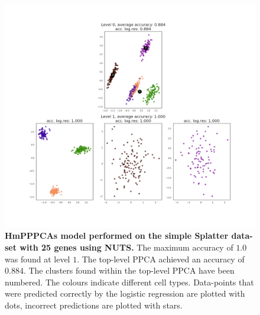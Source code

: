 \begin{figure}
    \centering
    \includegraphics[width=\linewidth]{figs/simple_25_nuts.png}
    \caption[HmPPPCAs model performed on the simple Splatter data-set with 25 genes using NUTS]{\small \textbf{HmPPPCAs model performed on the simple Splatter data-set with 25 genes using NUTS.} \small The maximum accuracy of $1.0$ was found at level $1$. The top-level PPCA achieved an accuracy of $0.884$. The clusters found within the top-level PPCA have been numbered. The colours indicate different cell types. Data-points that were predicted correctly by the logistic regression are plotted with dots, incorrect predictions are plotted with stars.}
    \label{fig:simple_25_nuts}
\end{figure}

